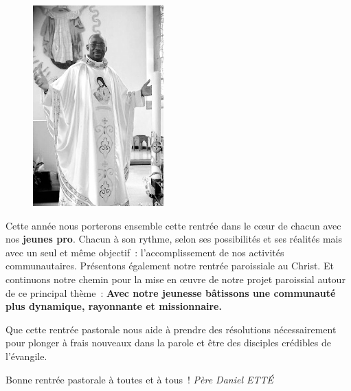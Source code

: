 \begin{figure}
\vspace{-0.4cm}
	\includegraphics[scale=1.20]{../images/standing_daniel}
\end{figure}
Cette année nous porterons ensemble cette rentrée dans le cœur de chacun avec nos \textbf{jeunes pro}. Chacun à son rythme, selon ses possibilités et ses réalités mais avec un seul et même objectif : l’accomplissement de nos activités communautaires. Présentons également notre rentrée paroissiale au Christ. Et continuons notre chemin pour la mise en œuvre de notre projet paroissial autour de ce principal thème : \textbf{\og Avec notre jeunesse bâtissons une communauté plus dynamique, rayonnante et missionnaire\fg{}.}

	Que cette rentrée pastorale nous aide à prendre des résolutions nécessairement pour plonger à frais nouveaux dans la parole et être des disciples crédibles de l’évangile.


\begin{flushright}
Bonne rentrée pastorale à toutes et à tous !
\textit{Père  Daniel  ETTÉ}
\end{flushright}


